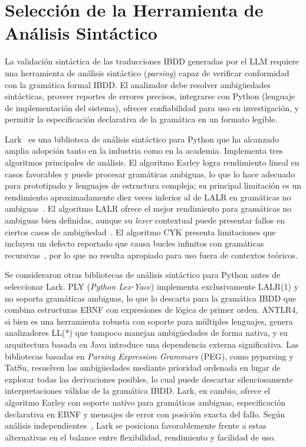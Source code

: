 \section{Selección de la Herramienta de Análisis Sintáctico}

La validación sintáctica de las traducciones IBDD generadas por el LLM requiere una herramienta de análisis sintáctico (\textit{parsing}) capaz de verificar conformidad con la gramática formal IBDD. El analizador debe resolver ambigüedades sintácticas, proveer reportes de errores precisos, integrarse con Python (lenguaje de implementación del sistema), ofrecer confiabilidad para uso en investigación, y permitir la especificación declarativa de la gramática en un formato legible.

Lark~\cite{lark_docs} es una biblioteca de análisis sintáctico para Python que ha alcanzado amplia adopción tanto en la industria como en la academia. Implementa tres algoritmos principales de análisis. El algoritmo Earley logra rendimiento lineal en casos favorables y puede procesar gramáticas ambiguas, lo que lo hace adecuado para prototipado y lenguajes de estructura compleja; su principal limitación es un rendimiento aproximadamente diez veces inferior al de LALR en gramáticas no ambiguas~\cite{lark_parsing_comparison}. El algoritmo LALR ofrece el mejor rendimiento para gramáticas no ambiguas bien definidas, aunque su \textit{lexer} contextual puede presentar fallos en ciertos casos de ambigüedad~\cite{lark_issues}. El algoritmo CYK presenta limitaciones que incluyen un defecto reportado que causa bucles infinitos con gramáticas recursivas~\cite{lark_issues}, por lo que no resulta apropiado para uso fuera de contextos teóricos.

Se consideraron otras bibliotecas de análisis sintáctico para Python antes de seleccionar Lark. PLY (\textit{Python Lex-Yacc}) implementa exclusivamente LALR(1) y no soporta gramáticas ambiguas, lo que lo descarta para la gramática IBDD que combina estructuras EBNF con expresiones de lógica de primer orden. ANTLR4, si bien es una herramienta robusta con soporte para múltiples lenguajes, genera analizadores LL(*) que tampoco manejan ambigüedades de forma nativa, y su arquitectura basada en Java introduce una dependencia externa significativa. Las bibliotecas basadas en \textit{Parsing Expression Grammars} (PEG), como pyparsing y TatSu, resuelven las ambigüedades mediante prioridad ordenada en lugar de explorar todas las derivaciones posibles, lo cual puede descartar silenciosamente interpretaciones válidas de la gramática IBDD. Lark, en cambio, ofrece el algoritmo Earley con soporte nativo para gramáticas ambiguas, especificación declarativa en EBNF y mensajes de error con posición exacta del fallo. Según análisis independientes~\cite{python_parsing_benchmarks}, Lark se posiciona favorablemente frente a estas alternativas en el balance entre flexibilidad, rendimiento y facilidad de uso.

